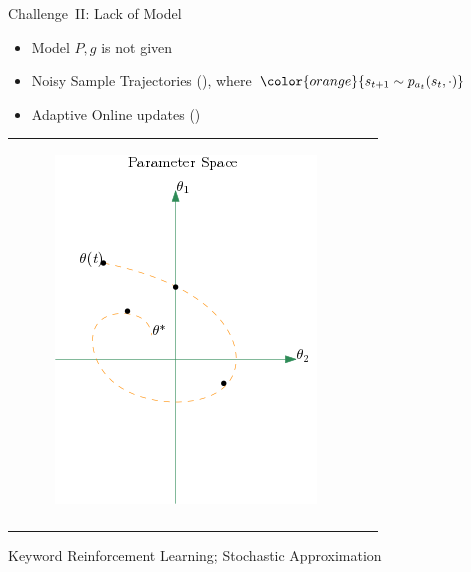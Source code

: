 \documentclass[10pt,handout]{beamer}
\begin{document}
\begin{frame}[fragile]{Challenge~II: {Lack of Model}}
\begin{itemize}
\item Model $P,g$ is not given
\item Noisy Sample Trajectories ({\color{orange}{$s_0-a_0-s_1-a_1-\cdots$}}), where ${\color{orange}{s_{t+1}\sim p_{a_t}(s_t,\cdot)}}$
\item Adaptive Online updates ({\color{orange}{$\theta(0), \theta(1), \ldots, \theta(t)$}})
\end{itemize}
\begin{table}
\begin{tabular}{cc}
\begin{minipage}{0.5\textwidth}
\begin{figure}
\includegraphics[scale=0.4]{traj.png}
\end{figure}
\end{minipage}
&
\begin{minipage}{0.5\textwidth}
\begin{block}{Question}
{\color{orange}{Stability?}}\\
{\color{orange}{$\theta(t)\ra \theta^*$ ?}}
\end{block}
\end{minipage}
\end{tabular}
\end{table}
\begin{block}{Keyword}
Reinforcement Learning; Stochastic Approximation
\end{block}

\end{frame}
\end{document}
